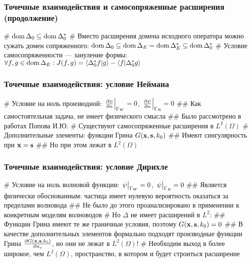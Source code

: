 \documentclass{beamer}
\begin{document}
\begin{frame}[fragile]
\frametitle{Точечные взаимодействия и самосопряженные расширения (продолжение)}
\begin{easylist}[itemize]
# $\operatorname{dom}{\Delta_0} \subseteq \operatorname{dom}{\Delta_0^*}$
# Вместо расширения домена исходного оператора можно сужать домен сопряженного: $\operatorname{dom}{\Delta_0} \subseteq \operatorname{dom}{\Delta_E} = \operatorname{dom}{\Delta_E^*} \subseteq \operatorname{dom}{\Delta_0^*}$
# Условие самосопряженности — зануление формы: $\forall f, g \in \dom{\Delta_E}: J(f, g) = \ip{\Delta_0^* f}{g} - \ip{f}{\Delta_0^* g}$
\end{easylist}
\end{frame}

\begin{frame}[fragile]
\frametitle{Точечные взаимодействия: условие Неймана}
\begin{easylist}[itemize]
# Условие на ноль производной: $\eval{\pdv{\psi}{n}}_{\Gamma_W} = 0$, $\eval{\pdv{\psi}{n}}_{\Gamma_R} = 0$
## Как самостоятельная задача, не имеет физического смысла
## Было рассмотрено в работах Попова И.Ю.
# Существуют самосопряженные расширения в $L^2(\Omega)$
# Дополнительные элементы: функции Грина $G(\vb{x}, \vb{s}, k_0)$
## Имеют сингулярность при $\vb{x} = \vb{s}$
## Но при этом лежат в $L^2(\Omega)$
\end{easylist}
\end{frame}


\begin{frame}[fragile]
\frametitle{Точечные взаимодействия: условие Дирихле}
\begin{easylist}[itemize]
# Условие на ноль волновой функции: $\eval{\psi}_{\Gamma_W} = 0$, $\eval{\psi}_{\Gamma_R} = 0$
## Является физически обоснованным: частица имеет нулевую вероятность оказаться за пределами волновода
## Не было до этого проанализировано в применении к конкретным моделям волноводов
# Но $\Delta$ не имеет расширений в $L^2$:
## Функции Грина имеют те же граничные условия, поэтому $G(\vb{x}, \vb{s}, k_0) = 0$
## В качестве дополнительных элементов формально подходят производные функции Грина $\pdv{G(\vb{x}, \vb{s}, k_0)}{n_s}$, но они не лежат в $L^2(\Omega)$!
# Необходим выход в более широкое, чем $L^2(\Omega)$, пространство, в котором и будет строиться расширение
\end{easylist}
\end{frame}

\end{document}

